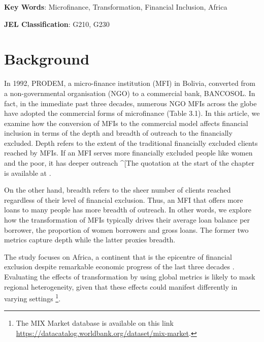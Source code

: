 \documentclass[a4paper, nobind]{templates/ociamthesis}
\begin{document}
\vspace{10mm}

\textbf{Key Words}: Microfinance, Transformation, Financial Inclusion, Africa

\vspace{5mm}

\textbf{JEL Classification}: G210, G230

\newpage

\newpage

\hypertarget{background-1}{%
\section{Background}\label{background-1}}

In 1992, PRODEM, a micro-finance institution (MFI) in Bolivia, converted from a non-governmental organisation (NGO) to a commercial bank, BANCOSOL. In fact, in the immediate past three decades, numerous NGO MFIs across the globe have adopted the commercial forms of microfinance (Table 3.1). In this article, we examine how the conversion of MFIs to the commercial model affects financial inclusion in terms of the depth and breadth of outreach to the financially excluded. Depth refers to the extent of the traditional financially excluded clients reached by MFIs. If an MFI serves more financially excluded people like women and the poor, it has deeper outreach \^{}{[}The quotation at the start of the chapter is available at \textcite{financialtimesinclusion}.

On the other hand, breadth refers to the sheer number of clients reached regardless of their level of financial exclusion. Thus, an MFI that offers more loans to many people has more breadth of outreach. In other words, we explore how the transformation of MFIs typically drives their average loan balance per borrower, the proportion of women borrowers and gross loans. The former two metrics capture depth while the latter proxies breadth.

The study focuses on Africa, a continent that is the epicentre of financial exclusion despite remarkable economic progress of the last three decades \autocite{beck2014sme,allen2011african}. Evaluating the effects of transformation by using global metrics is likely to mask regional heterogeneity, given that these effects could manifest differently in varying settings \autocite{d2017ngos,d2013unsubsidized} \footnote{The MIX Market database is available on this link \url{https://datacatalog.worldbank.org/dataset/mix-market}.}.
\end{document}
